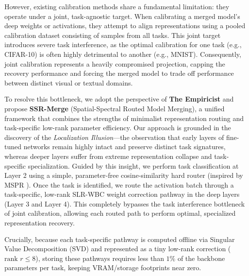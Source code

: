 \documentclass{article}
\theoremstyle{plain}
\theoremstyle{definition}
\theoremstyle{remark}
\begin{document}
However, existing calibration methods share a fundamental limitation: they operate under a joint, task-agnostic target. When calibrating a merged model's deep weights or activations, they attempt to align representations using a pooled calibration dataset consisting of samples from all tasks. This joint target introduces severe task interference, as the optimal calibration for one task (e.g., CIFAR-10) is often highly detrimental to another (e.g., MNIST). Consequently, joint calibration represents a heavily compromised projection, capping the recovery performance and forcing the merged model to trade off performance between distinct visual or textual domains.

To resolve this bottleneck, we adopt the perspective of \textbf{The Empiricist} and propose \textbf{SSR-Merge} (Spatial-Spectral Routed Model Merging), a unified framework that combines the strengths of minimalist representation routing and task-specific low-rank parameter efficiency. Our approach is grounded in the discovery of the \textit{Localization Illusion}---the observation that early layers of fine-tuned networks remain highly intact and preserve distinct task signatures, whereas deeper layers suffer from extreme representation collapse and task-specific specialization. Guided by this insight, we perform task classification at Layer 2 using a simple, parameter-free cosine-similarity hard router (inspired by MSPR \cite{mspr2026}). Once the task is identified, we route the activation batch through a task-specific, low-rank SLR-WBC weight correction pathway in the deep layers (Layer 3 and Layer 4). This completely bypasses the task interference bottleneck of joint calibration, allowing each routed path to perform optimal, specialized representation recovery.

Crucially, because each task-specific pathway is computed offline via Singular Value Decomposition (SVD) and represented as a tiny low-rank correction ($\text{rank } r \le 8$), storing these pathways requires less than $1\%$ of the backbone parameters per task, keeping VRAM/storage footprints near zero.
\end{document}
